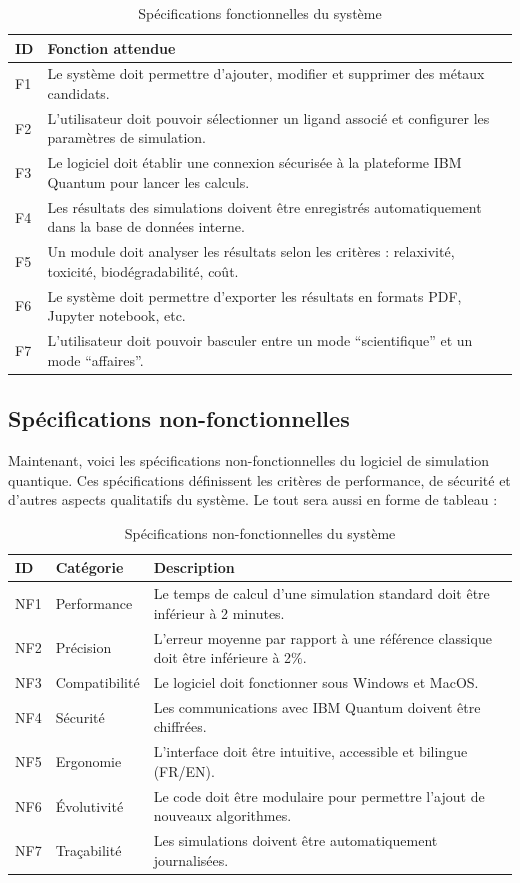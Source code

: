 \documentclass[11pt]{article}
\begin{document}
\begin{table}[h!]
\centering
\caption{Spécifications fonctionnelles du système}
\begin{tabular}{|p{1cm}|p{12cm}|}
\hline
\textbf{ID} & \textbf{Fonction attendue} \\
\hline
F1 & Le système doit permettre d’ajouter, modifier et supprimer des métaux candidats. \\
\hline
F2 & L’utilisateur doit pouvoir sélectionner un ligand associé et configurer les paramètres de simulation. \\
\hline
F3 & Le logiciel doit établir une connexion sécurisée à la plateforme IBM Quantum pour lancer les calculs. \\
\hline
F4 & Les résultats des simulations doivent être enregistrés automatiquement dans la base de données interne. \\
\hline
F5 & Un module doit analyser les résultats selon les critères : relaxivité, toxicité, biodégradabilité, coût. \\
\hline
F6 & Le système doit permettre d’exporter les résultats en formats PDF, Jupyter notebook, etc. \\
\hline
F7 & L’utilisateur doit pouvoir basculer entre un mode “scientifique” et un mode “affaires”. \\
\hline
\end{tabular}
\end{table}

\subsection{Spécifications non-fonctionnelles}
Maintenant, voici les spécifications non-fonctionnelles du logiciel de simulation quantique. Ces spécifications définissent les critères de performance, de sécurité et d’autres aspects qualitatifs du système. Le tout sera aussi en forme de tableau :
\begin{table}[h!]
\centering
\caption{Spécifications non-fonctionnelles du système}
\begin{tabular}{|p{1cm}|p{5cm}|p{8cm}|}
\hline
\textbf{ID} & \textbf{Catégorie} & \textbf{Description} \\
\hline
NF1 & Performance & Le temps de calcul d’une simulation standard doit être inférieur à 2 minutes. \\
\hline
NF2 & Précision & L’erreur moyenne par rapport à une référence classique doit être inférieure à 2\%. \\
\hline
NF3 & Compatibilité & Le logiciel doit fonctionner sous Windows et MacOS. \\
\hline
NF4 & Sécurité & Les communications avec IBM Quantum doivent être chiffrées. \\
\hline
NF5 & Ergonomie & L’interface doit être intuitive, accessible et bilingue (FR/EN). \\
\hline
NF6 & Évolutivité & Le code doit être modulaire pour permettre l’ajout de nouveaux algorithmes. \\
\hline
NF7 & Traçabilité & Les simulations doivent être automatiquement journalisées. \\
\hline
\end{tabular}
\end{table}
\end{document}
